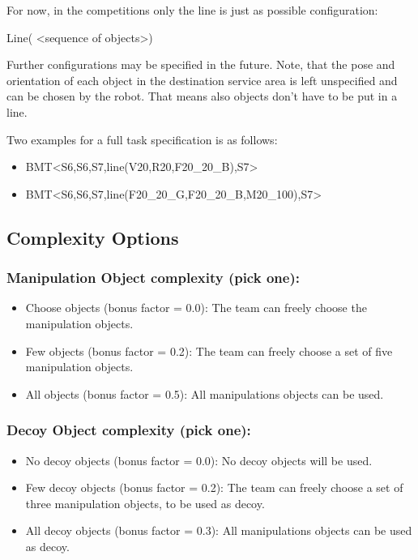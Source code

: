 For now, in the competitions only the line is just as possible configuration:
\par
Line( \textless sequence of objects\textgreater )
\par
Further configurations may be specified in the future. Note, that the pose and orientation of each object in the destination service area is left unspecified and can be chosen by the robot. That means also objects don’t have to be put in a line.

Two examples for a full task specification is as follows:
\begin{itemize}
	\item BMT\textless S6,S6,S7,line(V20,R20,F20\_20\_B),S7\textgreater 
	\item BMT\textless S6,S6,S7,line(F20\_20\_G,F20\_20\_B,M20\_100),S7\textgreater 
\end{itemize}


\subsection{Complexity Options}

\subsubsection{Manipulation Object complexity (pick one):}

\begin{itemize}
\item Choose objects (bonus factor =  0.0): The team can freely choose the manipulation objects.
\item Few objects (bonus factor =  0.2): The team can freely choose a set of five manipulation objects.
\item All objects (bonus factor =  0.5): All manipulations objects can be used.
\end{itemize}


\subsubsection{Decoy Object complexity (pick one):}

\begin{itemize}
\item No decoy objects (bonus factor =  0.0): No decoy objects will be used.
\item Few decoy objects (bonus factor =  0.2): The team can freely choose a set of three manipulation objects, to be used as decoy.
\item All decoy objects (bonus factor =  0.3): All manipulations objects can be used as decoy.
\end{itemize}


